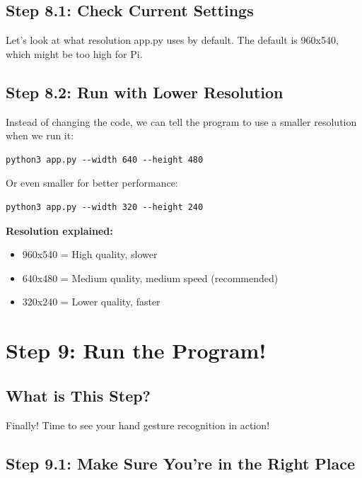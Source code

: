 \documentclass[12pt,a4paper]{article}
\begin{document}
\subsection{Step 8.1: Check Current Settings}

Let's look at what resolution app.py uses by default. The default is 960x540, which might be too high for Pi.

\subsection{Step 8.2: Run with Lower Resolution}

Instead of changing the code, we can tell the program to use a smaller resolution when we run it:

\begin{lstlisting}
python3 app.py --width 640 --height 480
\end{lstlisting}

Or even smaller for better performance:

\begin{lstlisting}
python3 app.py --width 320 --height 240
\end{lstlisting}

\begin{infobox}
\textbf{Resolution explained:}
\begin{itemize}
    \item 960x540 = High quality, slower
    \item 640x480 = Medium quality, medium speed (recommended)
    \item 320x240 = Lower quality, faster
\end{itemize}
\end{infobox}

\section{Step 9: Run the Program!}

\subsection{What is This Step?}

Finally! Time to see your hand gesture recognition in action!

\subsection{Step 9.1: Make Sure You're in the Right Place}
\end{document}
